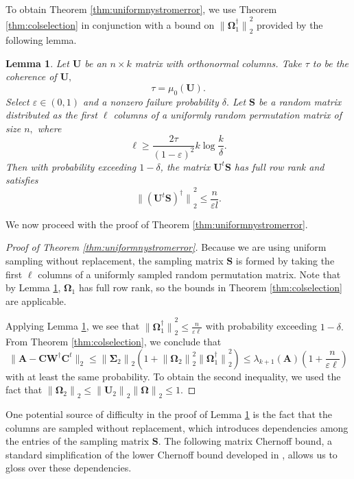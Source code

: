 \documentclass[11pt,letterpaper,twoside,reqno,nosumlimits]{amsart}
\newcommand{\mat}[1]{\ensuremath{\bm{#1}}}
\newcommand{\norm}[1]{\ensuremath{\big\|#1\big\|}}
\newtheorem{lemma}{Lemma}
\theoremstyle{remark}
\begin{document}
To obtain Theorem \ref{thm:uniformnystromerror}, we use Theorem \ref{thm:colselection} in conjunction with a bound on $\norm{\mat{\Omega}_1^\dagger}_2^2$ provided by the following lemma. 

\begin{lemma}
Let $\mat{U}$ be an $n \times k$ matrix with orthonormal columns. Take $\tau$ to be the coherence of $\mat{U}, $
\[
 \tau = \mu_0(\mat{U}).
\]
Select $\varepsilon \in (0,1)$ and a nonzero failure probability $\delta.$ Let $\mat{S}$ be a random matrix distributed as the first $\ell$ columns of a uniformly random permutation matrix of size $n,$ where
\[
 \ell \geq \frac{2\tau}{(1-\varepsilon)^2}k\log\frac{k}{\delta}.
\]
Then with probability exceeding $1- \delta$, the matrix $\mat{U}^t\mat{S}$ has full row rank and satisfies
\[
 \norm{(\mat{U}^t \mat{S})^\dagger}_2^2 \leq \frac{n}{\varepsilon l}.
\]
 \label{lem:omega1normbound}
\end{lemma}

We now proceed with the proof of Theorem \ref{thm:uniformnystromerror}.

\begin{proof}[Proof of Theorem \ref{thm:uniformnystromerror}]
Because we are using uniform sampling without replacement, the sampling matrix $\mat{S}$ is formed by taking the first $\ell$ columns of a uniformly sampled random permutation matrix. Note that by Lemma \ref{lem:omega1normbound}, $\mat{\Omega}_1$ has full row rank, so the bounds in Theorem \ref{thm:colselection} are applicable.

Applying Lemma \ref{lem:omega1normbound}, we see that $\norm{\mat{\Omega}_1^\dagger}_2^2 \leq \frac{n}{\varepsilon \ell}$ with probability exceeding $1-\delta.$ From Theorem \ref{thm:colselection}, we conclude that
 \[
  \|\mat{A} - \mat{C} \mat{W}^\dagger \mat{C}^t\|_2 \leq \norm{\mat{\Sigma}_2}_2 \left(1 + \norm{\mat{\Omega}_2}_2^2 \norm{\mat{\Omega}_1^\dagger}_2^2 \right) \leq \lambda_{k+1}(\mat{A})\left(1 + \frac{n}{\varepsilon \ell}\right)
 \]
with at least the same probability. To obtain the second inequality, we used the fact that $\norm{\mat{\Omega}_2}_2 \leq  \norm{\mat{U}_2}_2 \norm{\mat{\Omega}}_2 \leq 1.$

\end{proof}

One potential source of difficulty in the proof of Lemma \ref{lem:omega1normbound} is the fact that the columns are sampled without replacement, which introduces dependencies among the entries of the sampling matrix $\mat{S}.$ The following matrix Chernoff bound, a standard simplification of the lower Chernoff bound developed in \cite[Theorem 2.2]{T11}, allows us to gloss over these dependencies.
\end{document}
